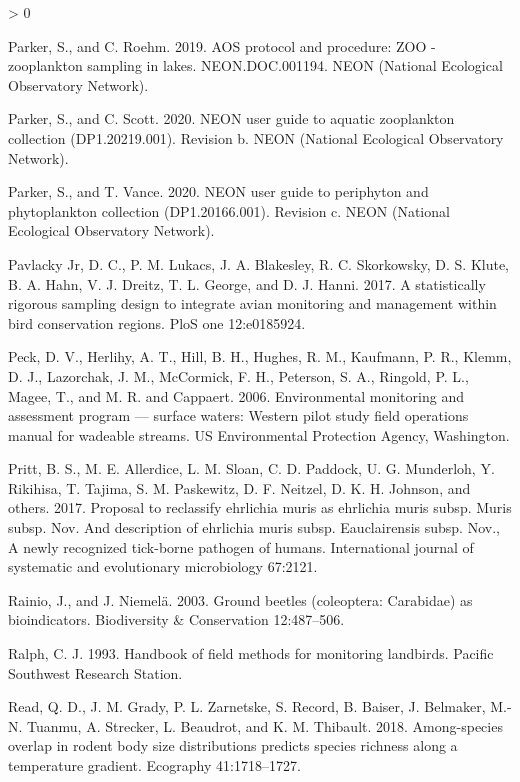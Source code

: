 \documentclass[
  12pt,
]{article}
\newlength{\cslhangindent}
\newenvironment{CSLReferences}[2] %
 {%
  \setlength{\parindent}{0pt}
  \ifodd #1 \everypar{\setlength{\hangindent}{\cslhangindent}}\ignorespaces\fi
  \ifnum #2 > 0
  \setlength{\parskip}{#2\baselineskip}
  \fi
 }%
 {}
\begin{document}
\begin{CSLReferences}{1}{0}
\leavevmode\hypertarget{ref-ParkerRoehm2019}{}%
Parker, S., and C. Roehm. 2019. AOS protocol and procedure: ZOO - zooplankton sampling in lakes. NEON.DOC.001194. NEON (National Ecological Observatory Network).

\leavevmode\hypertarget{ref-ParkerScott2020}{}%
Parker, S., and C. Scott. 2020. NEON user guide to aquatic zooplankton collection (DP1.20219.001). Revision b. NEON (National Ecological Observatory Network).

\leavevmode\hypertarget{ref-ParkerVance2020}{}%
Parker, S., and T. Vance. 2020. NEON user guide to periphyton and phytoplankton collection (DP1.20166.001). Revision c. NEON (National Ecological Observatory Network).

\leavevmode\hypertarget{ref-pavlacky2017statistically}{}%
Pavlacky Jr, D. C., P. M. Lukacs, J. A. Blakesley, R. C. Skorkowsky, D. S. Klute, B. A. Hahn, V. J. Dreitz, T. L. George, and D. J. Hanni. 2017. A statistically rigorous sampling design to integrate avian monitoring and management within bird conservation regions. PloS one 12:e0185924.

\leavevmode\hypertarget{ref-peck2006environmental}{}%
Peck, D. V., Herlihy, A. T., Hill, B. H., Hughes, R. M., Kaufmann, P. R., Klemm, D. J., Lazorchak, J. M., McCormick, F. H., Peterson, S. A., Ringold, P. L., Magee, T., and M. R. and Cappaert. 2006. Environmental monitoring and assessment program --- surface waters: Western pilot study field operations manual for wadeable streams. US Environmental Protection Agency, Washington.

\leavevmode\hypertarget{ref-pritt2017proposal}{}%
Pritt, B. S., M. E. Allerdice, L. M. Sloan, C. D. Paddock, U. G. Munderloh, Y. Rikihisa, T. Tajima, S. M. Paskewitz, D. F. Neitzel, D. K. H. Johnson, and others. 2017. Proposal to reclassify ehrlichia muris as ehrlichia muris subsp. Muris subsp. Nov. And description of ehrlichia muris subsp. Eauclairensis subsp. Nov., A newly recognized tick-borne pathogen of humans. International journal of systematic and evolutionary microbiology 67:2121.

\leavevmode\hypertarget{ref-rainio2003ground}{}%
Rainio, J., and J. Niemelä. 2003. Ground beetles (coleoptera: Carabidae) as bioindicators. Biodiversity \& Conservation 12:487--506.

\leavevmode\hypertarget{ref-ralph1993handbook}{}%
Ralph, C. J. 1993. Handbook of field methods for monitoring landbirds. Pacific Southwest Research Station.

\leavevmode\hypertarget{ref-read2018among}{}%
Read, Q. D., J. M. Grady, P. L. Zarnetske, S. Record, B. Baiser, J. Belmaker, M.-N. Tuanmu, A. Strecker, L. Beaudrot, and K. M. Thibault. 2018. Among-species overlap in rodent body size distributions predicts species richness along a temperature gradient. Ecography 41:1718--1727.


\end{CSLReferences}
\end{document}
